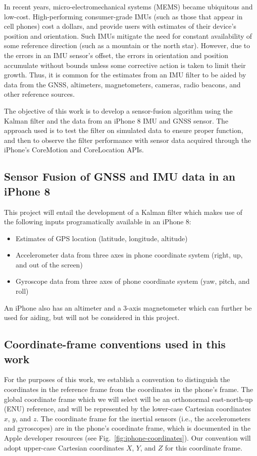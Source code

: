 \documentclass[10pt]{article}
\begin{document}
In recent years, micro-electromechanical systems (MEMS) became ubiquitous and low-cost. High-performing consumer-grade IMUs (such as those that appear in cell phones) cost a dollars, and provide users with estimates of their device's position and orientation. Such IMUs mitigate the need for constant availability of some reference direction (such as a mountain or the north star). However, due to the errors in an IMU sensor's offset, the errors in orientation and position accumulate without bounds unless some corrective action is taken to limit their growth. Thus, it is common for the estimates from an IMU filter to be aided by data from the GNSS, altimeters, magnetometers, cameras, radio beacons, and other reference sources.

The objective of this work is to develop a sensor-fusion algorithm using the Kalman filter and the data from an iPhone 8 IMU and GNSS sensor. The approach used is to test the filter on simulated data to ensure proper function, and then to observe the filter performance with sensor data acquired through the iPhone's CoreMotion and CoreLocation APIs.

\subsection{Sensor Fusion of GNSS and IMU data in an iPhone 8 }

This project will entail the development of a Kalman filter which makes use of the following inputs programatically available in an iPhone 8:

\begin{itemize}
    \item Estimates of GPS location (latitude, longitude, altitude)
    \item Accelerometer data from three axes in phone coordinate system (right, up, and out of the screen)
    \item Gyroscope data from three axes of phone coordinate system (yaw, pitch, and roll)
\end{itemize}

An iPhone also has an altimeter and a 3-axis magnetometer which can further be used for aiding, but will not be considered in this project.

\subsection{Coordinate-frame conventions used in this work}

For the purposes of this work, we establish a convention to distinguish the coordinates in the reference frame from the coordinates in the phone's frame. The global coordinate frame which we will select will be an orthonormal east-north-up (ENU) reference, and will be represented by the lower-case Cartesian coordinates $x$, $y$, and $z$. The coordinate frame for the inertial sensors (i.e., the accelerometers and gyroscopes) are in the phone's coordinate frame, which is documented in the Apple developer resources (see Fig.~\ref{fig:iphone-coordinates}). Our convention will adopt upper-case Cartesian coordinates $X$, $Y$, and $Z$ for this coordinate frame.
\end{document}
